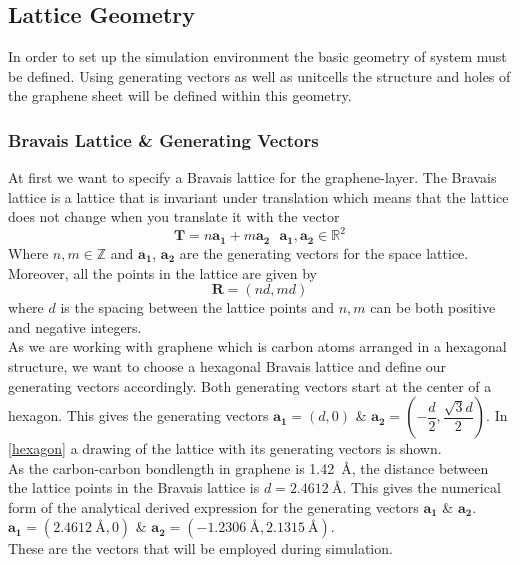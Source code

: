 
\subsection{Lattice Geometry}
In order to set up the simulation environment the basic geometry of system must be defined. Using generating vectors as well as unitcells the structure and holes of the graphene sheet will be defined within this geometry.
\subsubsection{Bravais Lattice \& Generating Vectors}\label{BLGV}
At first we want to specify a Bravais lattice for the graphene-layer. The Bravais lattice is a lattice that is invariant under translation which means that the lattice does not change when you translate it with the vector
\begin{equation}
 \mathbf{T}=n\mathbf{a_{1}}+m\mathbf{a_{2}}\ \ \ \mathbf{a_{1}},\mathbf{a_{2}} \in \mathbb{R}^{2}
\end{equation}
Where $n,m \in \mathbb{Z}$ and $\mathbf{a_{1}}$, $\mathbf{a_{2}}$ are the generating vectors for the space lattice. Moreover, all the points in the lattice are given by
\begin{equation}
 \mathbf{R}=(nd,md)
\end{equation}
where $d$ is the spacing between the lattice points and $n,m$ can be both positive and negative integers. \\
As we are working with graphene which is carbon atoms arranged in a hexagonal structure, we want to choose a hexagonal Bravais lattice and define our generating vectors accordingly. Both generating vectors start at the center of a hexagon. This gives the generating vectors $\mathbf{a_{1}}=(d,0)$ \& $\mathbf{a_{2}}=\left(-\dfrac{d}{2},\dfrac{\sqrt{3}d}{2}\right)$. In \cref{hexagon} a drawing of the lattice with its generating vectors is shown.\\
As the carbon-carbon bondlength in graphene is \SI{1.42}{\angstrom}, the distance between the lattice points  in the Bravais lattice is $d=\SI{2.4612}{\angstrom}$. This gives the numerical form of the analytical derived expression for the generating vectors  $\mathbf{a_{1}}$ \& $\mathbf{a_{2}}$. \\
$\mathbf{a_{1}}=(\SI{2.4612}{\angstrom},0)$ \& $\mathbf{a_{2}}=\left(-\SI{1.2306}{\angstrom},\SI{2.1315}{\angstrom}\right)$. \\These are the vectors that will be employed during simulation.
